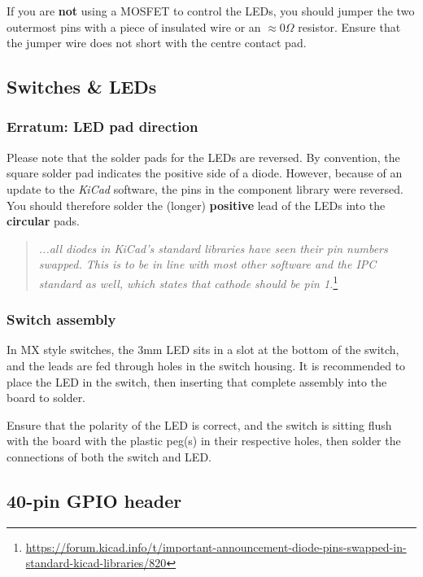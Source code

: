 \documentclass[10pt, a4paper, onesided]{article}
\begin{document}
		If you are \textbf{not} using a MOSFET to control the LEDs, you should jumper the two outermost pins with a piece of insulated wire or an $\approx0 \Omega$ resistor. Ensure that the jumper wire does not short with the centre contact pad.
	
	\subsection*{Switches \& LEDs}
	
		\subsubsection*{Erratum: LED pad direction}
		\label{LEDerror}
		
			Please note that the solder pads for the LEDs are reversed. By convention, the square solder pad indicates the positive side of a diode. However, because of an update to the \textit{KiCad} software, the pins in the component library were reversed. You should therefore solder the (longer) \textbf{positive} lead of the LEDs into the \textbf{circular} pads.
			
			\begin{quote}
				\textit{...all diodes in KiCad's standard libraries have seen their pin numbers swapped. This is to be in line with most other software and the IPC standard as well, which states that cathode should be pin 1.}\footnote{\url{https://forum.kicad.info/t/important-announcement-diode-pins-swapped-in-standard-kicad-libraries/820}}
			\end{quote}
	
		\subsubsection*{Switch assembly}
	
			In MX style switches, the 3mm LED sits in a slot at the bottom of the switch, and the leads are fed through holes in the switch housing. It is recommended to place the LED in the switch, then inserting that complete assembly into the board to solder.
			
			Ensure that the polarity of the LED is correct, and the switch is sitting flush with the board with the plastic peg(s) in their respective holes, then solder the connections of both the switch and LED.
	
	\subsection*{40-pin GPIO header}
	
\end{document}
